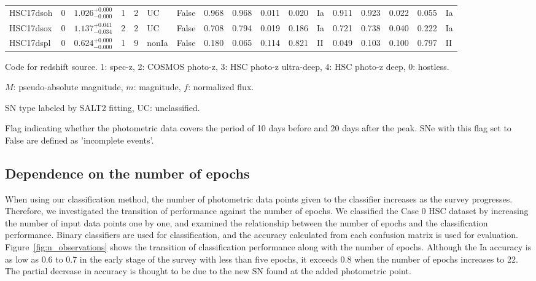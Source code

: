 \documentclass[useamsfonts]{pasj01}
\begin{document}
\begin{table}[htbp]
{\begin{tabular}{p{4.5em}p{1.2em}p{4.0em}p{2.1em}|p{0.6em}p{1.8em}p{3.0em}|p{2.9em}|p{1.2em}p{1.2em}p{1.2em}p{0.6em}|p{2.9em}|p{1.2em}p{1.2em}p{1.2em}p{0.6em}}
HSC17dsoh &     0 &    $1.026_{-0.000}^{+0.000}$ &         1 &    2 &  UC &   False &    0.968 &    0.968 &    0.011 &    0.020 &      Ia &    0.911 &    0.923 &    0.022 &    0.055 &      Ia \\
HSC17dsox &     0 &    $1.137_{-0.034}^{+0.041}$ &         2 &    2 &  UC &   False &    0.708 &    0.794 &    0.019 &    0.186 &      Ia &    0.721 &    0.738 &    0.040 &    0.222 &      Ia \\
HSC17dspl &     0 &    $0.624_{-0.000}^{+0.000}$ &         1 &    9 &  nonIa &   False &    0.180 &    0.065 &    0.114 &    0.821 &      II &    0.049 &    0.103 &    0.100 &    0.797 &      II \\
\hline
\end{tabular}
}\label{tab:h_results}
\begin{tabnote}
\footnotemark[$*$] Code for redshift source.
1: spec-z, 2: COSMOS photo-z, 3: HSC photo-z ultra-deep, 4: HSC photo-z deep, 0: hostless.

\footnotemark[$\dagger$] $M$: pseudo-absolute magnitude, $m$: magnitude, $f$: normalized flux.

\footnotemark[$\ddagger$] SN type labeled by SALT2 fitting, UC: unclassified.

\footnotemark[$\S$] Flag indicating whether the photometric data covers the period of 10 days before and 20 days after the peak. SNe with this flag set to False are defined as 'incomplete events'.
\end{tabnote}
\end{table}
%
%
\subsection{Dependence on the number of epochs}
%
When using our classification method, the number of photometric data points given to the classifier increases as the survey progresses.
Therefore, we investigated the transition of performance against the number of epochs.
We classified the Case 0 HSC dataset by increasing the number of input data points one by one, and examined the relationship between the number of epochs and the classification performance.
Binary classifiers are used for classification, and the accuracy calculated from each confusion matrix is used for evaluation.
Figure\ \ref{fig:n_observations} shows the transition of classification performance along with the number of epochs.
Although the Ia accuracy is as low as 0.6 to 0.7 in the early stage of the survey with less than five epochs, it exceeds 0.8 when the number of epochs increases to 22.
The partial decrease in accuracy is thought to be due to the new SN found at the added photometric point.
\end{document}
